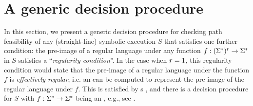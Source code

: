 

\section{A generic decision procedure} \label{sec:algo}
%

In this section, we present a generic decision procedure for checking path feasibility of any
(straight-line) symbolic execution $S$
that satisfies one further condition:
the pre-image of a regular language under any function 
$f: (\Sigma^*)^r \to \Sigma^*$ in $S$ satisfies a 
``\emph{regularity condition}''.
In the case when $r=1$, this regularity condition would state that the pre-image
of a regular language under the function $f$ is \emph{effectively regular}, i.e. an \FA{} can be computed to represent the pre-image of the regular language under $f$. This is
satisfied by \FT{}s \cite{Berstel,BG07,BG08}, and there is
a decision procedure for %
$S$ %
with $f: \Sigma^* \to \Sigma^*$ being an \FT{}, e.g., see 
\cite{LB16,BG07,BG08}. %

